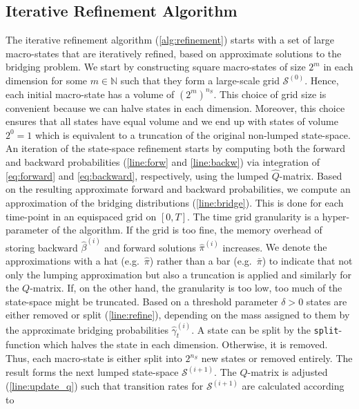 \subsection{Iterative Refinement Algorithm}\label{sec:bridging:alg}
The iterative refinement algorithm (\autoref{alg:refinement}) starts with a set of large macro-states
that are iteratively refined, based on approximate solutions
to the bridging problem.
We start by constructing square macro-states of size
$2^m$ in each dimension for some $m\in\mathbb{N}$ such that they form a large-scale grid $\mathcal{S}^{(0)}$.
Hence, each initial macro-state has a volume of ${\left(2^m\right)}^{n_S}$.
This choice of grid size is convenient because we can halve states
in each dimension.
Moreover, this choice ensures that all states have equal volume
and we end up with states of volume $2^0=1$ which is
equivalent to a truncation of the original non-lumped state-space.\\
\indent An iteration of the state-space refinement starts by computing both the
forward and backward probabilities (\autoref{line:forw} and \autoref{line:backw})  via integration of \eqref{eq:forward} and
\eqref{eq:backward}, respectively, using
 the lumped $\hat Q$-matrix.
Based on the resulting approximate forward and backward probabilities, we
  compute an approximation of the
bridging distributions (\autoref{line:bridge}).
This is done for each time-point in an equispaced grid on $[0,T]$.
The time grid granularity is a hyper-parameter of the algorithm.
If the grid is too fine, the memory overhead of storing backward $\hat\beta^{(i)}$
and forward solutions $\hat\pi^{(i)}$ increases.
{We denote the approximations with a hat (e.g.\ $\hat{\pi}$) rather than a bar (e.g.\ $\bar{\pi}$) to indicate that not only the lumping approximation but also a truncation is applied and similarly for the $Q$-matrix.}
If, on the other hand, the granularity is too low, too much of
the state-space might be truncated.
Based on a threshold parameter $\delta>0$
states are either removed or split (\autoref{line:refine}), depending on
the mass assigned to them by the approximate bridging
probabilities $\hat\gamma^{(i)}_t$.
A state can be split by the \texttt{split}-function which
halves the state in each dimension.
Otherwise, it is removed.
Thus, each macro-state is either split into $2^{n_S}$ new states or removed
entirely.
The result forms the next lumped state-space $\mathcal{S}^{(i+1)}$.
 The   $Q$-matrix is adjusted (\autoref{line:update_q}) such that transition rates  for $\mathcal{S}^{(i+1)}$  are calculated according to 
